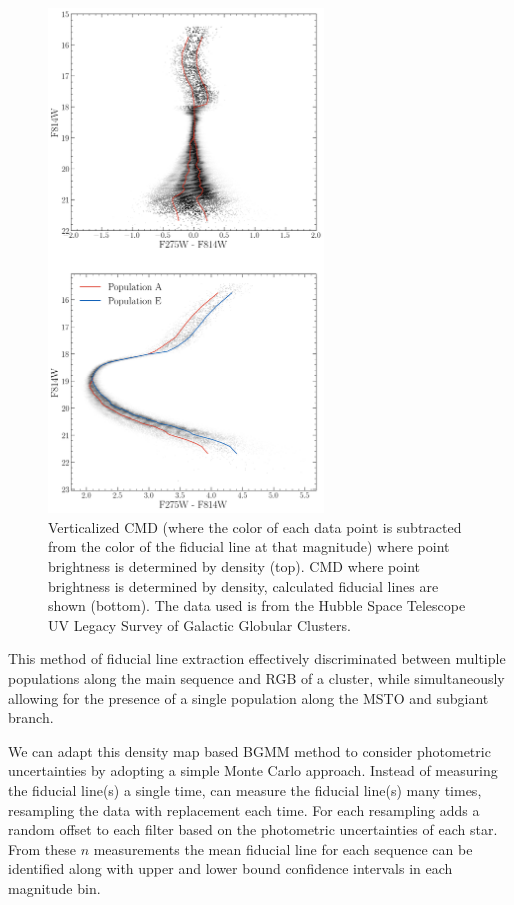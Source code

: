 \begin{figure}
	\centering
	\includegraphics[width=0.65\textwidth]{figures/ngc2808/vertFit.png}
  \caption{Verticalized CMD (where the color of each data point is subtracted
  from the color of the fiducial line at that magnitude) where point brightness
  is determined by density (top). CMD where point brightness is determined by
  density, calculated fiducial lines are shown (bottom). The data used is from
  the Hubble Space Telescope UV Legacy Survey of Galactic Globular Clusters.}
	\label{fig:vertFit}
\end{figure}

This method of fiducial line extraction effectively discriminated between
multiple populations along the main sequence and RGB of a cluster, while
simultaneously allowing for the presence of a single population along the MSTO
and subgiant branch. 

We can adapt this density map based BGMM method to consider photometric
uncertainties by adopting a simple Monte Carlo approach. Instead of measuring
the fiducial line(s) a single time, \fidanka can measure the fiducial line(s)
many times, resampling the data with replacement each time. For each resampling
\fidanka adds a random offset to each filter based on the photometric
uncertainties of each star. From these $n$ measurements the mean fiducial line
for each sequence can be identified along with upper and lower bound confidence
intervals in each magnitude bin.


